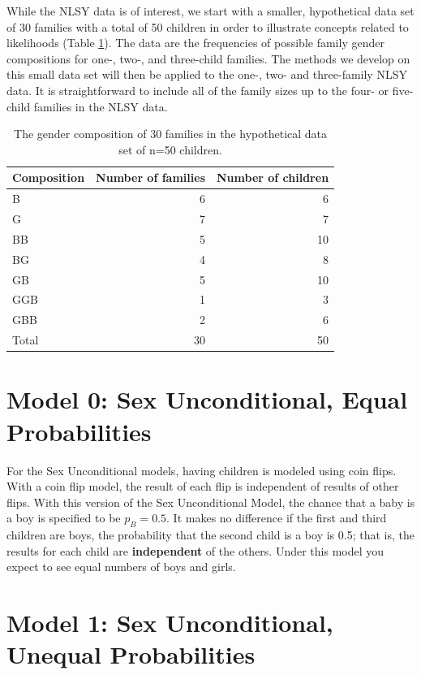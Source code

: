 \documentclass[
]{krantz}
\begin{document}
While the NLSY data is of interest, we start with a smaller, hypothetical data set of 30 families with a total of 50 children in order to illustrate concepts related to likelihoods (Table \ref{tab:table1chp2}). The data are the frequencies of possible family gender compositions for one-, two-, and three-child families. The methods we develop on this small data set will then be applied to the one-, two- and three-family NLSY data. It is straightforward to include all of the family sizes up to the four- or five-child families in the NLSY data.

\begin{table}

\caption{\label{tab:table1chp2}The gender composition of 30 families in the hypothetical data set of n=50 children.}
\centering
\begin{tabular}[t]{lrr}
\toprule
Composition & Number of families & Number of children\\
\midrule
B & 6 & 6\\
G & 7 & 7\\
BB & 5 & 10\\
BG & 4 & 8\\
GB & 5 & 10\\
\addlinespace
GGB & 1 & 3\\
GBB & 2 & 6\\
Total & 30 & 50\\
\bottomrule
\end{tabular}
\end{table}

\hypertarget{model-0-sex-unconditional-equal-probabilities}{%
\section{Model 0: Sex Unconditional, Equal Probabilities}\label{model-0-sex-unconditional-equal-probabilities}}

For the Sex Unconditional models, having children is modeled using coin flips. With a coin flip model, the result of each flip is independent of results of other flips. With this version of the Sex Unconditional Model, the chance that a baby is a boy is specified to be \(p_B=0.5\). It makes no difference if the first and third children are boys, the probability that the second child is a boy is 0.5; that is, the results for each child are \textbf{independent}  of the others. Under this model you expect to see equal numbers of boys and girls.

\hypertarget{sex_unconditional_model}{%
\section{Model 1: Sex Unconditional, Unequal Probabilities}\label{sex_unconditional_model}}
\end{document}
